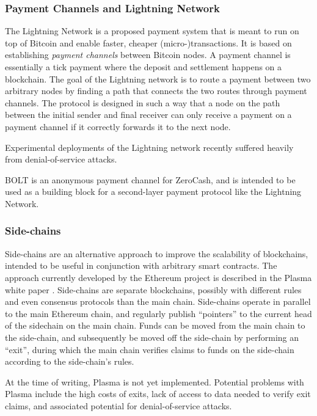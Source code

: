\subsubsection{Payment Channels and Lightning Network}
The Lightning Network \cite{poon2016bitcoin} is a proposed payment system that
is meant to run on top of Bitcoin and enable faster, cheaper
(micro-)transactions.  It is based on establishing \emph{payment channels}
between Bitcoin nodes.  A payment channel is essentially a tick payment where
the deposit and settlement happens on a blockchain.  The goal of the
Lightning network is to route a payment between two arbitrary nodes by finding a
path that connects the two routes through payment channels.  The protocol is
designed in such a way that a node on the path between the initial sender and
final receiver can only receive a payment on a payment channel if it correctly
forwards it to the next node.

Experimental deployments of the Lightning network recently suffered heavily
from denial-of-service attacks. %

BOLT \cite{green2016bolt} is an anonymous payment channel for ZeroCash, and is
intended to be used as a building block for a second-layer payment protocol
like the Lightning Network.

\subsubsection{Side-chains}
Side-chains are an alternative approach to improve the scalability of
blockchains, intended to be useful in conjunction with arbitrary smart
contracts.  The approach currently developed by the Ethereum project is
described in the Plasma white paper \cite{poon2017plasma}.  Side-chains are
separate blockchains, possibly with different rules and even consensus
protocols than the main chain.  Side-chains operate in parallel to the main
Ethereum chain, and regularly publish ``pointers'' to the current head of the
sidechain on the main chain.  Funds can be moved from the main chain to the
side-chain, and subsequently be moved off the side-chain by performing an
``exit'', during which the main chain verifies claims to funds on the
side-chain according to the side-chain's rules.

At the time of writing, Plasma is not yet implemented.  Potential problems with
Plasma include the high costs of exits, lack of access to data needed to verify
exit claims, and associated potential for denial-of-service attacks.



